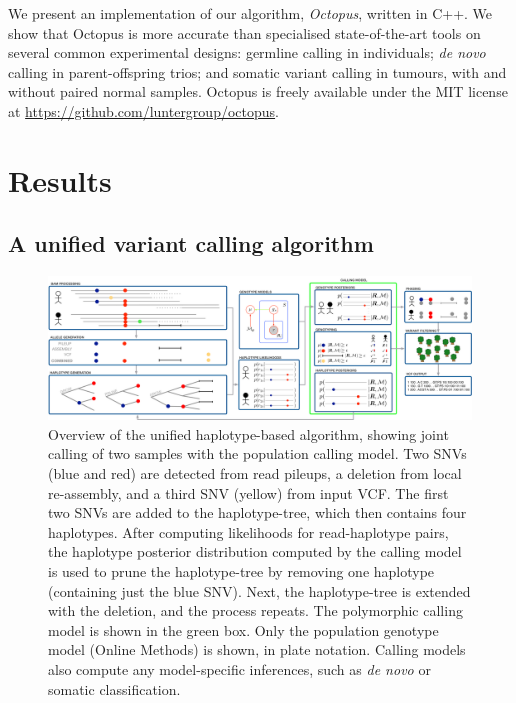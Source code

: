 \documentclass[notitlepage, twocolumn, 10pt]{article}
\begin{document}
We present an implementation of our algorithm, \emph{Octopus}, written in C++. We show that Octopus is more accurate than specialised state-of-the-art tools on several common experimental designs: germline calling in individuals; \textit{de novo} calling in parent-offspring trios; and somatic variant calling in tumours, with and without paired normal samples. Octopus 
is freely available under the MIT license at \url{https://github.com/luntergroup/octopus}.

\section*{Results}

\subsection*{A unified variant calling algorithm}

\begin{figure}[ht!]
    \includegraphics[width=\textwidth]{figures/method}
    \caption{Overview of the unified haplotype-based algorithm, showing joint calling of two samples with the population calling model. Two SNVs (blue and red) are detected from read pileups, a deletion from local re-assembly, and a third SNV (yellow) from input VCF. The first two SNVs are added to the haplotype-tree, which then contains four haplotypes. After computing likelihoods for read-haplotype pairs, the haplotype posterior distribution computed by the calling model is used to prune the haplotype-tree by removing one haplotype (containing just the blue SNV). Next, the haplotype-tree is extended with the deletion, and the process repeats. The polymorphic calling model is shown in the green box. 
    Only the population genotype model (Online Methods) is shown, in plate notation. Calling models also compute any model-specific inferences, such as \textit{de novo} or somatic classification.}
    \label{fig:method}
\end{figure}
\end{document}
